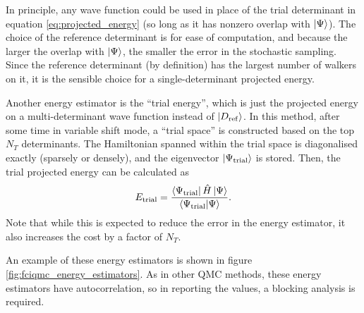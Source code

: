 In principle, any wave function could be used in place of the trial determinant in equation \ref{eq:projected_energy} (so long as it has nonzero overlap with $\ket\Psi$). The choice of the reference determinant is for ease of computation, and because the larger the overlap with $\ket\Psi$, the smaller the error in the stochastic sampling. Since the reference determinant (by definition) has the largest number of walkers on it, it is the sensible choice for a single-determinant projected energy.

Another energy estimator is the ``trial energy'',\supercite{bluntSemistochastic2015,petruzieloSemistochastic2012} which is just the projected energy on a multi-determinant wave function instead of $\ket{D_\mathrm{ref}}$. In this method, after some time in variable shift mode, a ``trial space'' is constructed based on the top $N_T$ determinants. The Hamiltonian spanned within the trial space is diagonalised exactly (sparsely or densely), and the eigenvector $\ket{\Psi_\mathrm{trial}}$ is stored. Then, the trial projected energy can be calculated as
\begin{equation}
    E_\mathrm{trial} = \frac{\bra{\Psi_\mathrm{trial}}\hat H\ket{\Psi}}{\braket{\Psi_\mathrm{trial}}{\Psi}}.
\end{equation}
Note that while this is expected to reduce the error in the energy estimator, it also increases the cost by a factor of $N_T$.

An example of these energy estimators is shown in figure \ref{fig:fciqmc_energy_estimators}. As in other \gls{QMC} methods, these energy estimators have autocorrelation, so in reporting the values, a blocking analysis is required.\supercite{flyvbjergError1989}

